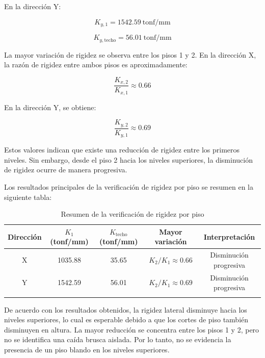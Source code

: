 En la dirección Y:

\begin{equation}
K_{y,1} = 1542.59 \ \text{tonf/mm}
\end{equation}

\begin{equation}
K_{y,\text{techo}} = 56.01 \ \text{tonf/mm}
\end{equation}

La mayor variación de rigidez se observa entre los pisos 1 y 2. En la dirección X, la razón de rigidez entre ambos pisos es aproximadamente:

\begin{equation}
\frac{K_{x,2}}{K_{x,1}} \approx 0.66
\end{equation}

En la dirección Y, se obtiene:

\begin{equation}
\frac{K_{y,2}}{K_{y,1}} \approx 0.69
\end{equation}

Estos valores indican que existe una reducción de rigidez entre los primeros niveles. Sin embargo, desde el piso 2 hacia los niveles superiores, la disminución de rigidez ocurre de manera progresiva.

Los resultados principales de la verificación de rigidez por piso se resumen en la siguiente tabla:

\begin{table}[H]
    \centering
    \caption{Resumen de la verificación de rigidez por piso}
    \begin{tabular}{ccccc}
    \hline
    Dirección & $K_1$ (tonf/mm) & $K_{\text{techo}}$ (tonf/mm) & Mayor variación & Interpretación \\
    \hline
    X & 1035.88 & 35.65 & $K_{2}/K_{1} \approx 0.66$ & Disminución progresiva \\
    Y & 1542.59 & 56.01 & $K_{2}/K_{1} \approx 0.69$ & Disminución progresiva \\
    \hline
        \vspace{0.001cm}
    \end{tabular}
    
\end{table}

De acuerdo con los resultados obtenidos, la rigidez lateral disminuye hacia los niveles superiores, lo cual es esperable debido a que los cortes de piso también disminuyen en altura. La mayor reducción se concentra entre los pisos 1 y 2, pero no se identifica una caída brusca aislada. Por lo tanto, no se evidencia la presencia de un piso blando en los niveles superiores.

